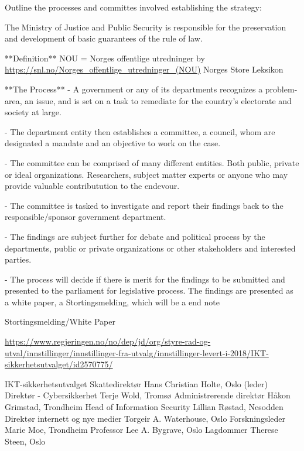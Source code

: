 \begin{followup}
    Outline the processes and committes involved establishing the strategy:

    The Ministry of Justice and Public Security is
    responsible for the preservation and development
    of basic guarantees of the rule of law.

    **Definition**
    NOU = Norges offentlige utredninger
    by \url{https://snl.no/Norges_offentlige_utredninger_(NOU)} Norges Store Leksikon

    **The Process**
    - A government or any of its departments recognizes a problem-area,
    an issue, and is set on a task to remediate for the country's
    electorate and society at large.

    - The department entity then establishes a committee, a council,
    whom are designated a mandate and an objective to work on the case.

    - The committee can be comprised of many different entities. Both
    public, private or ideal organizations. Researchers, subject matter
    experts or anyone who may provide valuable contributution to the
    endevour.

    - The committee is tasked to investigate and report their findings
    back to the responsible/sponsor government department.

    - The findings are subject further for debate and political process
    by the departments, public or private organizations or other
    stakeholders and interested parties.

    - The process will decide if there is merit for the findings to
    be submitted and presented to the parliament for legislative process.
    The findings are presented as a white paper, a Stortingsmelding,
    which will be a 
end note

Stortingsmelding/White Paper

    \url{https://www.regjeringen.no/no/dep/jd/org/styre-rad-og-utval/innstillinger/innstillinger-fra-utvalg/innstillinger-levert-i-2018/IKT-sikkerhetsutvalget/id2570775/}
    
    IKT-sikkerhetsutvalget
    Skattedirektør Hans Christian Holte, Oslo (leder)
    Direktør - Cybersikkerhet Terje Wold, Tromsø
    Administrerende direktør Håkon Grimstad, Trondheim
    Head of Information Security Lillian Røstad, Nesodden
    Direktør internett og nye medier Torgeir A. Waterhouse, Oslo
    Forskningsleder Marie Moe, Trondheim
    Professor Lee A. Bygrave, Oslo
    Lagdommer Therese Steen, Oslo


\end{followup}
